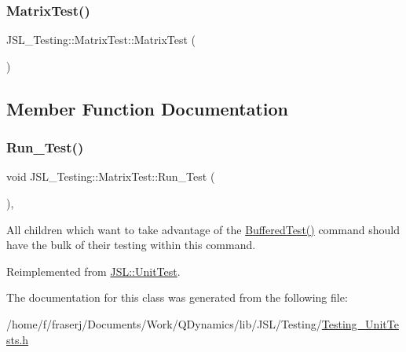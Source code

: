 \subsubsection{\texorpdfstring{Matrix\+Test()}{MatrixTest()}}
{\footnotesize\ttfamily J\+S\+L\+\_\+\+Testing\+::\+Matrix\+Test\+::\+Matrix\+Test (\begin{DoxyParamCaption}{ }\end{DoxyParamCaption})\hspace{0.3cm}{\ttfamily [inline]}}



\subsection{Member Function Documentation}
\mbox{\label{classJSL__Testing_1_1MatrixTest_a8fe2a671faf414dbd13c407ab52b75fb}} 
\subsubsection{\texorpdfstring{Run\+\_\+\+Test()}{Run\_Test()}}
{\footnotesize\ttfamily void J\+S\+L\+\_\+\+Testing\+::\+Matrix\+Test\+::\+Run\+\_\+\+Test (\begin{DoxyParamCaption}{ }\end{DoxyParamCaption})\hspace{0.3cm}{\ttfamily [inline]}, {\ttfamily [virtual]}}



All children which want to take advantage of the \hyperlink{classJSL_1_1UnitTest_aabec19b081be8a428f12e4b5e3dc2a9c}{Buffered\+Test()} command should have the bulk of their testing within this command. 



Reimplemented from \hyperlink{classJSL_1_1UnitTest_aa8369ab1ce2a537bff2ea7e1c8818490}{J\+S\+L\+::\+Unit\+Test}.



The documentation for this class was generated from the following file\+:\begin{DoxyCompactItemize}
\item 
/home/f/fraserj/\+Documents/\+Work/\+Q\+Dynamics/lib/\+J\+S\+L/\+Testing/\hyperlink{Testing__UnitTests_8h}{Testing\+\_\+\+Unit\+Tests.\+h}\end{DoxyCompactItemize}
